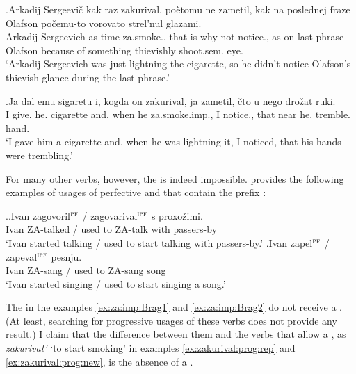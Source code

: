 \exg.\label{ex:zakurival:prog:rep}Arkadij Sergeevi\v{c} kak raz zakurival, po\`{e}tomu ne zametil, kak na poslednej fraze Olafson po\v{c}emu-to vorovato strel'nul glazami.\\
Arkadij Sergeevich as time za.smoke., {that is why} not notice., as on last phrase Olafson {because of something} thievishly shoot.sem. eye.\\
\trans `Arkadij Sergeevich was just lightning the cigarette, so he didn't notice Olafson's thievish glance during the last phrase.'

\exg.\label{ex:zakurival:prog:new}Ja dal emu sigaretu i, kogda on zakurival, ja zametil, \v{c}to u nego dro\v{z}at ruki.\\
I give. he. cigarette and, when he za.smoke.imp., I notice., that near he. tremble. hand.\\
\trans `I gave him a cigarette and, when he was lightning it, I noticed, that his hands were trembling.'\\

For many other verbs, however, the  is indeed impossible. \citet{Braginsky:08} provides the following examples of usages of perfective and  that contain the  prefix :

\ex.\label{ex:za:imp:Brag}\ag.\label{ex:za:imp:Brag1}Ivan zagovoril$^{\textsc{pf}}$ / zagovarival$^{\textsc{ipf}}$ s proxo\v{z}imi.\\
Ivan ZA-talked / {used to ZA-talk} with passers-by\\
\trans `Ivan started talking / used to start talking with passers-by.'
\bg.\label{ex:za:imp:Brag2}Ivan zapel$^{\textsc{pf}}$ / zapeval$^{\textsc{ipf}}$ pesnju.\\
Ivan ZA-sang / {used to ZA-sang} song\\
\trans `Ivan started singing / used to start singing a song.'\\

The  in the examples \ref{ex:za:imp:Brag1} and \ref{ex:za:imp:Brag2} do not receive a . (At least, searching for progressive usages of these verbs does not provide any result.) I claim that the difference between them and the verbs that allow a , as \textit{zakurivat'} `to start smoking' in examples \ref{ex:zakurival:prog:rep} and \ref{ex:zakurival:prog:new}, is the absence of a . 


